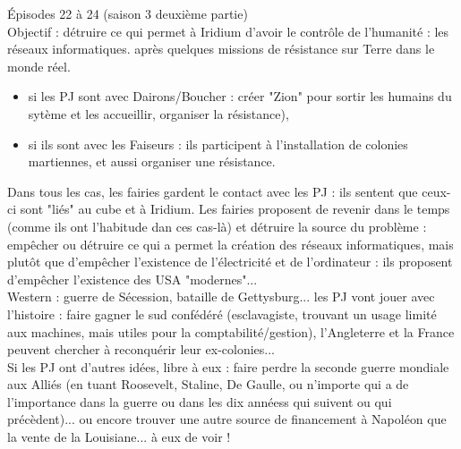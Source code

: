 \documentclass[11pt,twoside,a4paper]{book}
\begin{document}
{\'E}pisodes 22 {\`a} 24 (saison 3 deuxi{\`e}me partie) ~\\
Objectif : d{\'e}truire ce qui permet {\`a} Iridium d'avoir le contr{\^o}le de l'humanit{\'e} : les r{\'e}seaux informatiques. apr{\`e}s quelques missions de r{\'e}sistance sur Terre dans le monde r{\'e}el. ~\\
\begin{itemize}
	\item si les PJ sont avec Dairons/Boucher : cr{\'e}er "Zion" pour sortir les humains du syt{\`e}me et les accueillir, organiser la r{\'e}sistance), 
	\item si ils sont avec les Faiseurs : ils participent {\`a} l'installation de colonies martiennes, et aussi organiser une r{\'e}sistance. 
\end{itemize}
Dans tous les cas, les fairies gardent le contact avec les PJ : ils sentent que ceux-ci sont "li{\'e}s" au cube et {\`a} Iridium. Les fairies proposent de revenir dans le temps (comme ils ont l'habitude dan ces cas-l{\`a}) et d{\'e}truire la source du probl{\`e}me : emp{\^e}cher ou d{\'e}truire ce qui a permet la cr{\'e}ation des r{\'e}seaux informatiques, mais plut{\^o}t que d'emp{\^e}cher l'existence de l'{\'e}lectricit{\'e} et de l'ordinateur : ils proposent d'emp{\^e}cher l'existence des USA "modernes"... ~\\

Western : guerre de S{\'e}cession, bataille de Gettysburg... les PJ vont jouer avec l'histoire : faire gagner le sud conf{\'e}d{\'e}r{\'e} (esclavagiste, trouvant un usage limit{\'e} aux machines, mais utiles pour la comptabilit{\'e}/gestion), l'Angleterre et la France peuvent chercher {\`a} reconqu{\'e}rir leur ex-colonies... ~\\
Si les PJ ont d'autres id{\'e}es, libre {\`a} eux : faire perdre la seconde guerre mondiale aux Alli{\'e}s (en tuant Roosevelt, Staline, De Gaulle, ou n'importe qui a de l'importance dans la guerre ou dans les dix ann{\'e}ess qui suivent ou qui pr{\'e}c{\`e}dent)... ou encore trouver une autre source de financement {\`a} Napol{\'e}on que la vente de la Louisiane... {\`a} eux de voir ! ~\\

\clearpage
\end{document}
